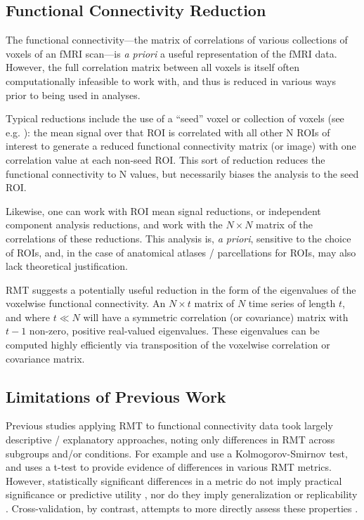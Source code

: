 \documentclass[12pt]{spieman}  %
\begin{document}
\begin{spacing}{2}
\subsection{Functional Connectivity Reduction}

The functional connectivity—the matrix of correlations of
various collections of voxels of an fMRI scan—is \textit{a priori} a useful
representation of the fMRI data. However, the full correlation matrix between
all voxels is itself often computationally infeasible to work with, and thus is
reduced in various ways prior to being used in analyses.

Typical reductions include the use of a ``seed'' voxel or collection of voxels
(see e.g. ): the mean signal over that ROI
is correlated with all other N ROIs of interest to generate a reduced
functional connectivity matrix (or image) with one correlation value at each
non-seed ROI. This sort of reduction reduces the functional connectivity to N
values, but necessarily biases the analysis to the seed ROI.

Likewise, one can work with ROI mean signal reductions, or independent
component analysis reductions\cite{joelRelationshipSeedbasedICAbased2011,
smithCharacterizingIndividualDifferences2014}, and work with the \(N \times N\)
matrix of the correlations of these reductions. This analysis is, \textit{a
priori}, sensitive to the choice of ROIs, and, in the case of anatomical
atlases / parcellations for ROIs, may also lack theoretical justification.

RMT suggests a potentially useful reduction in the form of the eigenvalues of
the voxelwise functional connectivity. An \(N \times t\) matrix of
\(N\) time series of length \(t\), and where \(t \ll N\) will have a symmetric
correlation (or covariance) matrix with \(t - 1\) non-zero, positive
real-valued eigenvalues. These eigenvalues can be computed highly
efficiently via transposition of the voxelwise correlation or covariance
matrix.

\subsection{Limitations of Previous Work}

Previous studies applying RMT to functional connectivity
data\cite{wangRandomMatrixTheory2016,
wangSpectralPropertiesTemporal2015a,matharooSpontaneousBackpainAlters2020,
guRandomMatrixTheory2020} took largely descriptive / explanatory approaches,
noting only differences in RMT across subgroups and/or conditions. For example
 and  use
a Kolmogorov-Smirnov test, and 
uses a t-test to provide evidence of differences in various RMT metrics.
However, statistically significant differences in a metric do not imply
practical significance or predictive utility
\cite{loWhySignificantVariables2015}, nor do they imply generalization or
replicability \cite{amrheinEarthFlat052017}. Cross-validation, by contrast,
attempts to more directly assess these properties
\cite{yarkoniChoosingPredictionExplanation2017}.


\end{spacing}
\end{document}
